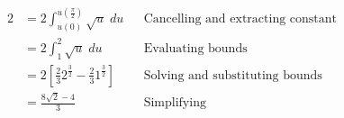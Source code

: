 \documentclass[a4paper, 11pt]{article}
\begin{document}
\begin{enumerate}[label=(\alph*)]
\begin{alignat*}{2}
            & = 2\int_{u(0)}^{u(\frac{\pi}2)}\sqrt{u}\;du                                         &  & \text{Cancelling and extracting constant} \\
            & = 2\int_1^2 \sqrt u \; du                                                           &  & \text{Evaluating bounds}                  \\
            & = 2\left[  \frac 23 2^{\frac 32} - \frac 23 1^{\frac 32}             \right]        &  & \text{Solving and substituting bounds}    \\
            & = \frac  { 8\sqrt{2} - 4 }3                                                         &  & \text{Simplifying}                        \\
        \end{alignat*}
\end{enumerate}
\end{document}
